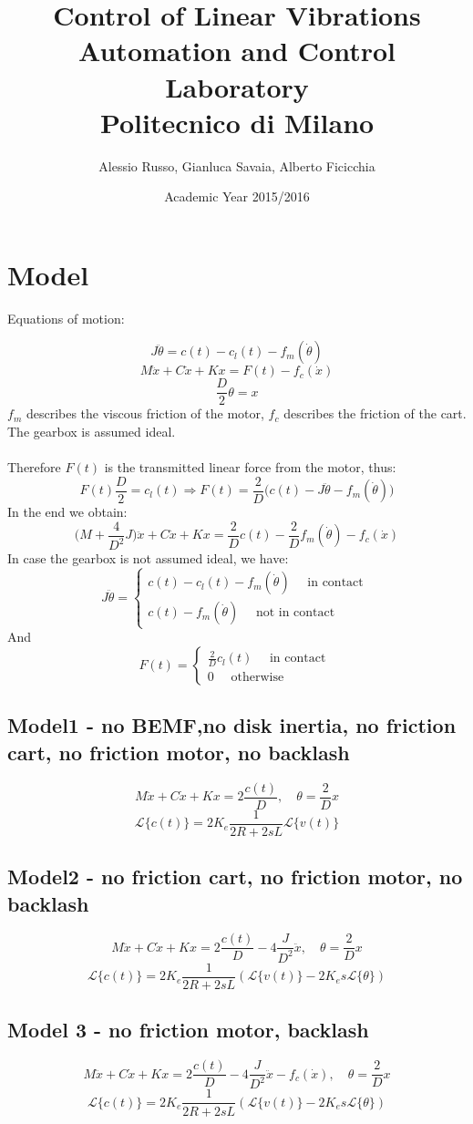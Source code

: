 \documentclass[10pt,a4paper]{report}
\author{Alessio Russo, Gianluca Savaia, Alberto Ficicchia}
\title{Control of Linear Vibrations \\
\Large Automation and Control Laboratory \\
 Politecnico di Milano}
\date{Academic Year 2015/2016}
\begin{document}
\maketitle
\tableofcontents
\chapter{Model}
Equations of motion:

$$J\ddot{\theta}=c(t)-c_l(t) - f_m(\dot{\theta})$$
$$M\ddot{x}+C\dot{x}+Kx = F(t) - f_c(\dot{x})$$
$$\frac{D}{2}\theta = x$$
$f_m$ describes the viscous friction of the motor, $f_c$ describes the friction of the cart. The gearbox is assumed ideal. \\ \\
Therefore $F(t)$ is the transmitted linear force from the motor, thus:
$$F(t)\frac{D}{2} = c_l(t) \Rightarrow F(t) = \frac{2}{D} \Big(c(t)-J\ddot{\theta}-f_m(\dot{\theta})\Big)$$
In the end we obtain:
$$\Big(M+\frac{4}{D^2} J\Big) \ddot{x}+C\dot{x}+Kx = \frac{2}{D}c(t) -\frac{2}{D}f_m(\dot{\theta}) - f_c(\dot{x})$$
In case the gearbox is not assumed ideal, we have:
$$J\ddot{\theta}= \begin{cases}
c(t)-c_l(t) - f_m(\dot{\theta}) \quad \text{ in contact } \\
c(t)-f_m(\dot{\theta}) \quad \text{ not in contact }
\end{cases}
$$
And
$$F(t) = \begin{cases}
\frac{2}{D}c_l(t)\quad \text{ in contact } \\
0 \quad \text{ otherwise }
\end{cases}
$$

\section{Model1 - no BEMF,no disk inertia, no friction cart, no friction motor, no backlash}
$$M\ddot{x} + C\dot{x}+Kx = 2\frac{c(t)}{D}, \quad \theta = \frac{2}{D}x$$
$$\mathcal{L}\{c(t)\} = 2K_e \frac{1}{2R+2sL} \mathcal{L}\{ v(t)\}$$

\section{Model2 - no friction cart, no friction motor, no backlash}
$$M\ddot{x} + C\dot{x}+Kx = 2\frac{c(t)}{D}  - 4\frac{J}{D^2}\ddot{x}, \quad \theta = \frac{2}{D}x$$
$$\mathcal{L}\{c(t)\} = 2K_e \frac{1}{2R+2sL} (\mathcal{L}\{ v(t)\}-2K_e s \mathcal{L}\{\theta \})$$


\section{Model 3 - no friction motor, backlash}
$$M\ddot{x} + C\dot{x}+Kx = 2\frac{c(t)}{D} - 4\frac{J}{D^2}\ddot{x} - f_c(\dot{x}), \quad \theta = \frac{2}{D}x$$
$$\mathcal{L}\{c(t)\} = 2K_e \frac{1}{2R+2sL} (\mathcal{L}\{ v(t)\}-2K_e s \mathcal{L}\{\theta \})$$
\end{document}
